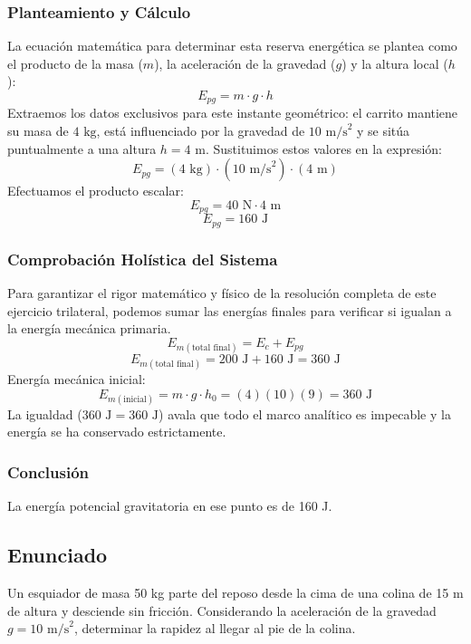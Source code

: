 \documentclass[12pt,a4paper]{article}
\begin{document}
\subsubsection*{Planteamiento y Cálculo}
La ecuación matemática para determinar esta reserva energética se plantea como el producto de la masa ($m$), la aceleración de la gravedad ($g$) y la altura local ($h$):
$$E_{pg} = m \cdot g \cdot h$$
Extraemos los datos exclusivos para este instante geométrico: el carrito mantiene su masa de $4 \text{ kg}$, está influenciado por la gravedad de $10 \text{ m/s}^2$ y se sitúa puntualmente a una altura $h = 4 \text{ m}$. Sustituimos estos valores en la expresión:
$$E_{pg} = (4 \text{ kg}) \cdot (10 \text{ m/s}^2) \cdot (4 \text{ m})$$
Efectuamos el producto escalar:
$$E_{pg} = 40 \text{ N} \cdot 4 \text{ m}$$
$$E_{pg} = 160 \text{ J}$$

\subsubsection*{Comprobación Holística del Sistema}
Para garantizar el rigor matemático y físico de la resolución completa de este ejercicio trilateral, podemos sumar las energías finales para verificar si igualan a la energía mecánica primaria.
$$E_{m(\text{total final})} = E_c + E_{pg}$$
$$E_{m(\text{total final})} = 200 \text{ J} + 160 \text{ J} = 360 \text{ J}$$
Energía mecánica inicial:
$$E_{m(\text{inicial})} = m \cdot g \cdot h_0 = (4)(10)(9) = 360 \text{ J}$$
La igualdad ($360 \text{ J} = 360 \text{ J}$) avala que todo el marco analítico es impecable y la energía se ha conservado estrictamente.

\subsubsection*{Conclusión}
La energía potencial gravitatoria en ese punto es de 160 J.

\newpage

\subsection*{Enunciado}
Un esquiador de masa 50 kg parte del reposo desde la cima de una colina de 15 m de altura y desciende sin fricción. Considerando la aceleración de la gravedad $g = 10 \text{ m/s}^2$, determinar la rapidez al llegar al pie de la colina.
\end{document}
